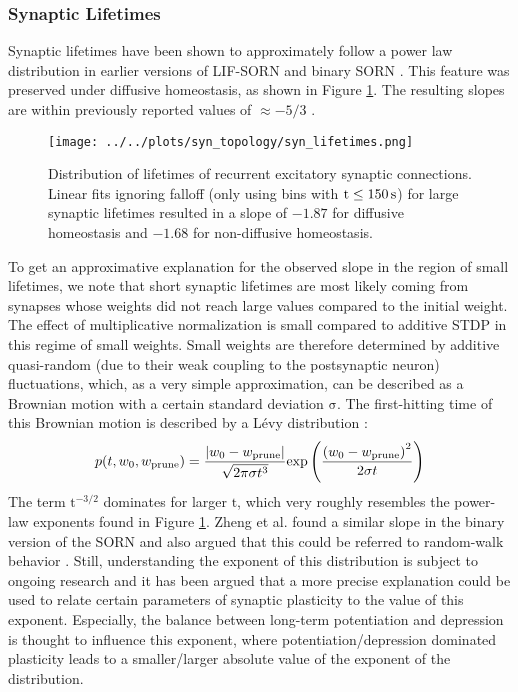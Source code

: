 \documentclass[10pt,a4paper]{article}
\begin{document}
\subsubsection{Synaptic Lifetimes}
Synaptic lifetimes have been shown to approximately follow a power law distribution in earlier versions of LIF-SORN and binary SORN \cite{SORN_Paper,Pengsheng_2013}. This feature was preserved under diffusive homeostasis, as shown in Figure \ref{Syn_Lifetimes}. The resulting slopes are within previously reported values of $\mathrm{\approx - 5/3}$ \cite{SORN_Paper}.
\begin{figure}
\texttt{[image: ../../plots/syn\_topology/syn\_lifetimes.png]}
\caption{Distribution of lifetimes of recurrent excitatory synaptic connections. Linear fits ignoring falloff (only using bins with $\rm t \leq 150 \, s$) for large synaptic lifetimes resulted in a slope of $\mathrm{-1.87}$ for diffusive homeostasis and $\mathrm{-1.68}$ for non-diffusive homeostasis.}
\label{Syn_Lifetimes}
\end{figure}
To get an approximative explanation for the observed slope in the region of small lifetimes, we note that short synaptic lifetimes are most likely coming from synapses whose weights did not reach large values compared to the initial weight. The effect of multiplicative normalization is small compared to additive STDP in this regime of small weights. Small weights are therefore determined by additive quasi-random (due to their weak coupling to the postsynaptic neuron) fluctuations, which, as a very simple approximation, can be described as a Brownian motion with a certain standard deviation $\mathrm{\sigma}$. The first-hitting time of this Brownian motion is described by a Lévy distribution \cite{Roy_1968}:
\begin{equation}
p(t,w_0,w_{\rm prune}) = \frac{ | w_0-w_{\rm prune}|}{\sqrt{2\pi \sigma t^3}} \mathrm{exp} \left( \frac{ \left( w_0-w_{\rm prune} \right) ^2}{2\sigma t}\right)
\label{Levy_Dist}
\end{equation}
The term $\mathrm{t^{-3/2}}$ dominates for larger $\mathrm{t}$, which very roughly resembles the power-law exponents found in Figure \ref{Syn_Lifetimes}. Zheng et al. found a similar slope in the binary version of the SORN and also argued that this could be referred to random-walk behavior \cite{Pengsheng_2013}. Still, understanding the exponent of this distribution is subject to ongoing research and it has been argued that a more precise explanation could be used to relate certain parameters of synaptic plasticity to the value of this exponent. Especially, the balance between long-term potentiation and depression is thought to influence this exponent, where potentiation/depression dominated plasticity leads to a smaller/larger absolute value of the exponent of the distribution.
\end{document}
